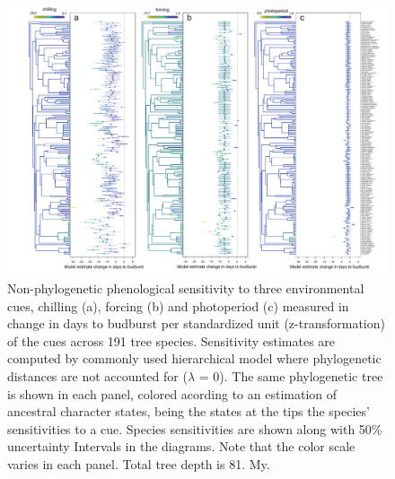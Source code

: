 \documentclass[11pt]{article}
\begin{document}
\begin{figure}
  \begin{center}
  \includegraphics[width=16cm]{../../analyses/phylogeny/figures/FigSXX_ phylo_muplots191_lamb0.pdf}
  \caption{Non-phylogenetic phenological sensitivity to three environmental cues, chilling (a), forcing (b) and photoperiod (c) measured in change in days to budburst per standardized unit (z-transformation) of the cues across 191 tree species. Sensitivity estimates are computed by commonly used hierarchical model where phylogenetic distances are not accounted for ($\lambda$ = 0). The same phylogenetic tree is shown in each panel, colored acording to an estimation of ancestral character states, being the states at the tips the species' sensitivities to a cue. Species sensitivities are shown along with 50\% uncertainty Intervals in the diagrams. Note that the color scale varies in each panel. Total tree depth is 81. My.}
  \label{fig:suppmuplot_all} 
  \end{center}
\end{figure}
\end{document}

